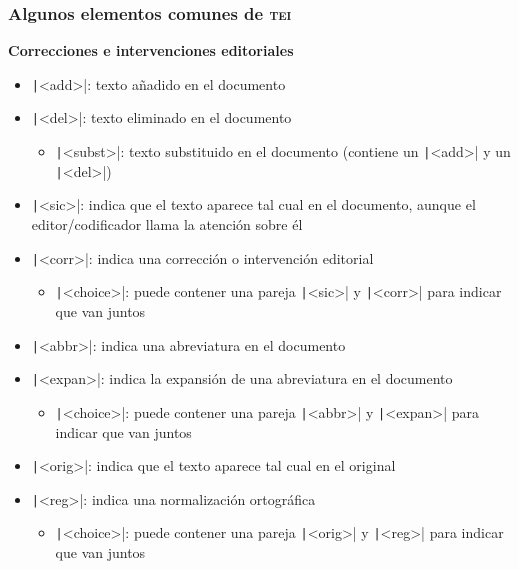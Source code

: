 \documentclass[%
  handout, %
  xcolor=svgnames]{beamer}
\newcommand*{\azul}[1]{\textcolor[HTML]{14145A}{#1}}
\newcommand*{\TEI}{\textsc{tei}}
\begin{document}
\begin{frame}
  \frametitle{Algunos elementos comunes de \TEI}

  \textbf{\azul{Correcciones e intervenciones editoriales}}

  \smallskip

  \begin{itemize}
      
    \item \texttt|<add>|: texto añadido en el documento
    \item \texttt|<del>|: texto eliminado en el documento
      \begin{itemize}
        \item \texttt|<subst>|: texto substituido en el documento (contiene un  \texttt|<add>| y un  \texttt|<del>|)
      \end{itemize}
    \item \texttt|<sic>|: indica que el texto aparece tal cual en el documento, aunque el editor/codificador llama la atención sobre él
    \item \texttt|<corr>|: indica una corrección o intervención editorial
      \begin{itemize}
        \item \texttt|<choice>|: puede contener una pareja \texttt|<sic>| y \texttt|<corr>| para indicar que van juntos
      \end{itemize}
    \item \texttt|<abbr>|: indica una abreviatura en el documento
    \item \texttt|<expan>|: indica la expansión de una abreviatura en el documento
       \begin{itemize}
        \item \texttt|<choice>|: puede contener una pareja \texttt|<abbr>| y \texttt|<expan>| para indicar que van juntos
      \end{itemize}
    \item \texttt|<orig>|: indica que el texto aparece tal cual en el original
    \item \texttt|<reg>|: indica una normalización ortográfica
      \begin{itemize}
        \item \texttt|<choice>|: puede contener una pareja \texttt|<orig>| y \texttt|<reg>| para indicar que van juntos
      \end{itemize}
  \end{itemize}
\end{frame}
\end{document}
